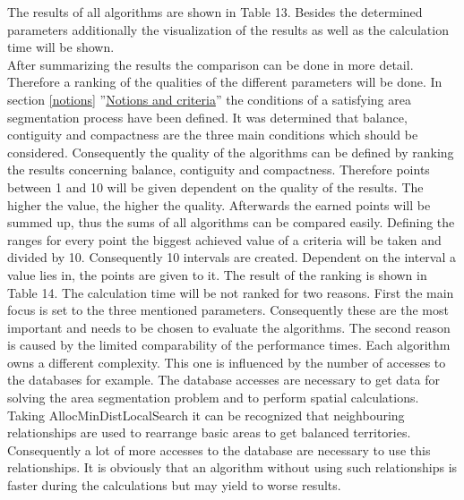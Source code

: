  The results of all algorithms are shown in Table 13. Besides the determined parameters additionally the visualization of the results as well as the calculation time will be shown. \newline
 \\ After summarizing the results the comparison can be done in more detail. Therefore a ranking of the qualities of the different parameters will be done. In section \ref{notions} ''\hyperref[notions]{Notions and criteria}'' the conditions of a satisfying area segmentation process have been defined. It was determined that balance, contiguity and compactness are the three main conditions which should be considered. Consequently the quality of the algorithms can be defined by ranking the results concerning balance, contiguity and compactness. Therefore points between 1 and 10 will be given dependent on the quality of the results. The higher the value, the higher the quality. Afterwards the earned points will be summed up, thus the sums of all algorithms can be compared easily. Defining the ranges for every point the biggest achieved value of a criteria will be taken and divided by 10. Consequently 10 intervals are created. Dependent on the interval a value lies in, the points are given to it. The result of the ranking is shown in Table 14. The calculation time will be not ranked for two reasons. First the main focus is set to the three mentioned parameters. Consequently these are the most important and needs to be chosen to evaluate the algorithms. The second reason is caused by the limited comparability of the performance times. Each algorithm owns a different complexity. This one is influenced by the number of accesses to the databases for example. The database accesses are necessary to get data for solving the area segmentation problem and to perform spatial calculations. Taking AllocMinDistLocalSearch it can be recognized that neighbouring relationships are used to rearrange basic areas to get balanced territories. Consequently a lot of more accesses to the database are necessary to use this relationships. It is obviously that an algorithm without using such relationships is faster during the calculations but may yield to worse results. 
 


